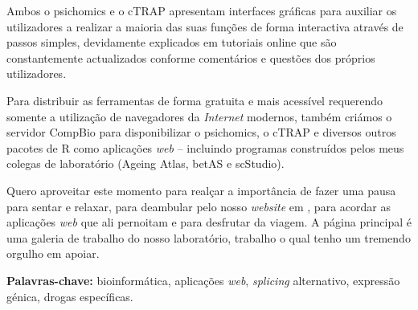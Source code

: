 Ambos o psichomics e o cTRAP apresentam interfaces gráficas para auxiliar os utilizadores a realizar a maioria das suas funções de forma interactiva através de passos simples, devidamente explicados em tutoriais online que são constantemente actualizados conforme comentários e questões dos próprios utilizadores.

Para distribuir as ferramentas de forma gratuita e mais acessível requerendo somente a utilização de navegadores da \emph{Internet} modernos, também criámos o servidor CompBio para disponibilizar o psichomics, o cTRAP e diversos outros pacotes de R como aplicações \emph{web} -- incluindo programas construídos pelos meus colegas de laboratório (Ageing Atlas, betAS e scStudio).

Quero aproveitar este momento para realçar a importância de fazer uma pausa para sentar e relaxar, para deambular pelo nosso \emph{website} em , para acordar as aplicações \emph{web} que ali pernoitam e para desfrutar da viagem. A página principal é uma galeria de trabalho do nosso laboratório, trabalho o qual tenho um tremendo orgulho em apoiar.

\textbf{Palavras-chave:} bioinformática, aplicações \emph{web}, \emph{splicing} alternativo, expressão génica, drogas específicas.


